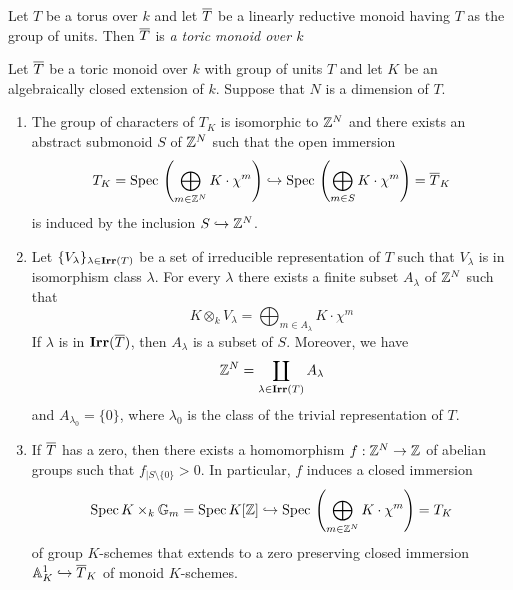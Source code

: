 \begin{definition}
Let $T$ be a torus over $k$ and let $\overline{T}$ be a linearly reductive monoid having $T$ as the group of units. Then $\overline{T}$ is \textit{a toric monoid over $k$}
\end{definition}

\begin{theorem}\label{theorem:toric_monoids_properties_Kempf_torus}
Let $\overline{T}$ be a toric monoid over $k$ with group of units $T$ and let $K$ be an algebraically closed extension of $k$. Suppose that $N$ is a dimension of $T$.
\begin{enumerate}[label=\emph{\textbf{(\arabic*)}}, leftmargin=3.0em]
\item The group of characters of $T_K$ is isomorphic to ${\mathbb Z}^N$ and there exists an abstract submonoid $S$ of ${\mathbb Z}^N$ such that the open immersion
$$T_K = \mathrm{Spec}\,\left(\bigoplus_{m\in {\mathbb Z}^N}K\cdot \chi^m\right) \hookrightarrow \mathrm{Spec}\,\left(\bigoplus_{m\in S}K\cdot \chi^m\right) = \overline{T}_K$$
is induced by the inclusion $S\hookrightarrow {\mathbb Z}^N$.
\item Let $\{V_{\lambda}\}_{\lambda\in \mathbf{Irr}(T)}$ be a set of irreducible representation of $T$ such that $V_{\lambda}$ is in isomorphism class $\lambda$. For every $\lambda$ there exists a finite subset $A_{\lambda}$ of ${\mathbb Z}^N$ such that
$$K\otimes_kV_{\lambda} = \bigoplus_{m\in A_{\lambda}}K\cdot \chi^m$$
If $\lambda$ is in  $\mathbf{Irr}(\overline{T})$, then $A_{\lambda}$ is a subset of $S$. Moreover, we have
$${\mathbb Z}^N = \coprod_{\lambda\in \mathbf{Irr}(T)}A_{\lambda}$$
and $A_{\lambda_0} = \{0\}$, where $\lambda_0$ is the class of the trivial representation of $T$.
\item If $\overline{T}$ has a zero, then there exists a homomorphism $f:{\mathbb Z}^N\rightarrow {\mathbb Z}$ of abelian groups such that $f_{\mid S\setminus \{0\}}>0$. In particular, $f$ induces a closed immersion
$$\mathrm{Spec}\, K\times_k \mathbb{G}_{m} = \mathrm{Spec}\, K[{\mathbb Z}]\hookrightarrow \mathrm{Spec}\, \left(\bigoplus_{m\in {\mathbb Z}^N}K\cdot \chi^m\right) = T_K$$
of group $K$-schemes that extends to a zero preserving closed immersion $\mathbb{A}^1_K\hookrightarrow \overline{T}_K$ of monoid $K$-schemes.
\end{enumerate}
\end{theorem}
